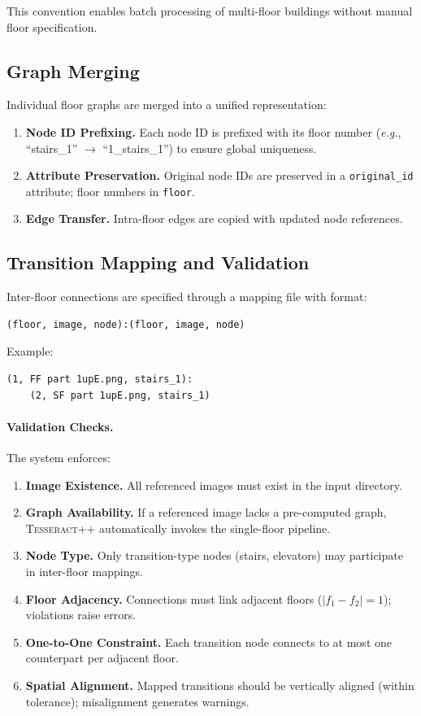 \documentclass[manuscript,screen,review]{acmart}
\newcommand{\tesseract}{\textsc{Tesseract++}}
\newcommand{\eg}{\textit{e.g.}}
\begin{document}
This convention enables batch processing of multi-floor buildings without manual floor specification.

\subsection{Graph Merging}
\label{subsec:merging}

Individual floor graphs are merged into a unified representation:

\begin{enumerate}
    \item \textbf{Node ID Prefixing.} Each node ID is prefixed with its floor number (\eg, ``stairs\_1'' $\rightarrow$ ``1\_stairs\_1'') to ensure global uniqueness.
    \item \textbf{Attribute Preservation.} Original node IDs are preserved in a \texttt{original\_id} attribute; floor numbers in \texttt{floor}.
    \item \textbf{Edge Transfer.} Intra-floor edges are copied with updated node references.
\end{enumerate}

\subsection{Transition Mapping and Validation}
\label{subsec:mapping}

Inter-floor connections are specified through a mapping file with format:
\begin{verbatim}
(floor, image, node):(floor, image, node)
\end{verbatim}

Example:
\begin{verbatim}
(1, FF part 1upE.png, stairs_1):
    (2, SF part 1upE.png, stairs_1)
\end{verbatim}

\paragraph{Validation Checks.} The system enforces:

\begin{enumerate}
    \item \textbf{Image Existence.} All referenced images must exist in the input directory.
    \item \textbf{Graph Availability.} If a referenced image lacks a pre-computed graph, \tesseract{} automatically invokes the single-floor pipeline.
    \item \textbf{Node Type.} Only transition-type nodes (stairs, elevators) may participate in inter-floor mappings.
    \item \textbf{Floor Adjacency.} Connections must link adjacent floors ($|f_1 - f_2| = 1$); violations raise errors.
    \item \textbf{One-to-One Constraint.} Each transition node connects to at most one counterpart per adjacent floor.
    \item \textbf{Spatial Alignment.} Mapped transitions should be vertically aligned (within tolerance); misalignment generates warnings.
\end{enumerate}
\end{document}

